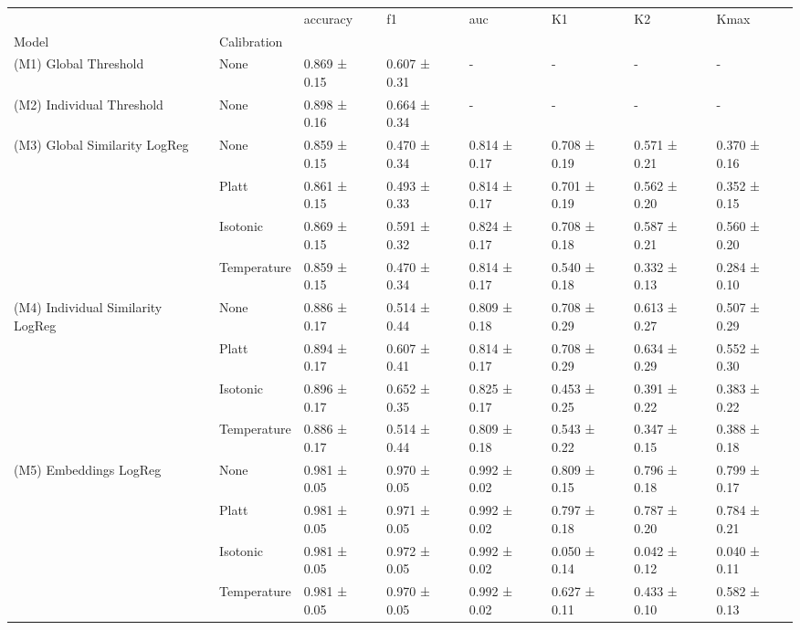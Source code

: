 \begin{tabular}{llllllll}
\toprule
 &  & accuracy & f1 & auc & K1 & K2 & Kmax \\
Model & Calibration &  &  &  &  &  &  \\
\midrule
(M1) Global Threshold & None & 0.869 ± 0.15 & 0.607 ± 0.31 & - & - & - & - \\
\cline{1-8}
(M2) Individual Threshold & None & 0.898 ± 0.16 & 0.664 ± 0.34 & - & - & - & - \\
\cline{1-8}
\multirow[t]{4}{*}{(M3) Global Similarity LogReg} & None & 0.859 ± 0.15 & 0.470 ± 0.34 & 0.814 ± 0.17 & 0.708 ± 0.19 & 0.571 ± 0.21 & 0.370 ± 0.16 \\
 & Platt & 0.861 ± 0.15 & 0.493 ± 0.33 & 0.814 ± 0.17 & 0.701 ± 0.19 & 0.562 ± 0.20 & 0.352 ± 0.15 \\
 & Isotonic & 0.869 ± 0.15 & 0.591 ± 0.32 & 0.824 ± 0.17 & 0.708 ± 0.18 & 0.587 ± 0.21 & 0.560 ± 0.20 \\
 & Temperature & 0.859 ± 0.15 & 0.470 ± 0.34 & 0.814 ± 0.17 & 0.540 ± 0.18 & 0.332 ± 0.13 & 0.284 ± 0.10 \\
\cline{1-8}
\multirow[t]{4}{*}{(M4) Individual Similarity LogReg} & None & 0.886 ± 0.17 & 0.514 ± 0.44 & 0.809 ± 0.18 & 0.708 ± 0.29 & 0.613 ± 0.27 & 0.507 ± 0.29 \\
 & Platt & 0.894 ± 0.17 & 0.607 ± 0.41 & 0.814 ± 0.17 & 0.708 ± 0.29 & 0.634 ± 0.29 & 0.552 ± 0.30 \\
 & Isotonic & 0.896 ± 0.17 & 0.652 ± 0.35 & 0.825 ± 0.17 & 0.453 ± 0.25 & 0.391 ± 0.22 & 0.383 ± 0.22 \\
 & Temperature & 0.886 ± 0.17 & 0.514 ± 0.44 & 0.809 ± 0.18 & 0.543 ± 0.22 & 0.347 ± 0.15 & 0.388 ± 0.18 \\
\cline{1-8}
\multirow[t]{4}{*}{(M5) Embeddings LogReg} & None & 0.981 ± 0.05 & 0.970 ± 0.05 & 0.992 ± 0.02 & 0.809 ± 0.15 & 0.796 ± 0.18 & 0.799 ± 0.17 \\
 & Platt & 0.981 ± 0.05 & 0.971 ± 0.05 & 0.992 ± 0.02 & 0.797 ± 0.18 & 0.787 ± 0.20 & 0.784 ± 0.21 \\
 & Isotonic & 0.981 ± 0.05 & 0.972 ± 0.05 & 0.992 ± 0.02 & 0.050 ± 0.14 & 0.042 ± 0.12 & 0.040 ± 0.11 \\
 & Temperature & 0.981 ± 0.05 & 0.970 ± 0.05 & 0.992 ± 0.02 & 0.627 ± 0.11 & 0.433 ± 0.10 & 0.582 ± 0.13 \\
\cline{1-8}
\bottomrule
\end{tabular}

